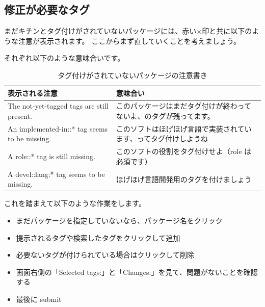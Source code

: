 \documentclass[mingoth,a4paper]{jsarticle}
\begin{document}
\clearpage

\subsection{修正が必要なタグ}

まだキチンとタグ付けがされていないパッケージには、赤い×印と共に以下のような注意が表示されます。
ここからまず直していくことを考えましょう。

それぞれ以下のような意味合いです。

   \begin{table}[h]
    \begin{center}
      {
        \begin{tabular}{l|l} \hline
                表示される注意 & 意味合い \\ \hline \hline
The not-yet-tagged tags are still present. & このパッケージはまだタグ付けが終わってないよ、のタグが残ってます。 \\
An implemented-in::* tag seems to be missing. & このソフトはほげほげ言語で実装されています、ってタグ付けしようね \\
A role::* tag is still missing. & このソフトの役割をタグ付けせよ（role は必須です） \\
A devel::lang:* tag seems to be missing. & ほげほげ言語開発用のタグを付けましょう \\
           \end{tabular}
        }
     \caption{タグ付けがされていないパッケージの注意書き}
     \label{tagwarning}
    \end{center}
    \end{table}

これを踏まえて以下のような作業をします。

\begin{itemize}
 \item まだパッケージを指定していないなら、パッケージ名をクリック
 \item 提示されるタグや検索したタグをクリックして追加
 \item 必要ないタグが付けられている場合はクリックして削除
 \item 画面右側の「Selected tags:」と「Changes:」を見て、問題がないことを確認する
 \item 最後に submit 
\end{itemize}
\end{document}
